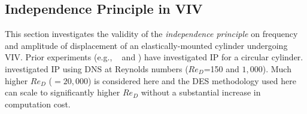 \subsection{Independence Principle in VIV}
\label{sec:IPinVIV}
%
This section investigates the validity of the {\em independence principle} on
frequency and amplitude of displacement of an elastically-mounted cylinder
undergoing VIV. Prior experiments (e.g., ~\citet{jain2013vortex} and
\citet{franzini2013one}) have investigated IP for a circular cylinder.
\citet{zhao2015validity} investigated IP using DNS at Reynolds numbers
($Re_D$=150 and $1,000$). Much higher $Re_D$ ($=20,000$) is considered here and
the DES methodology used here can scale to significantly higher $Re_D$ without
a substantial increase in computation cost.

